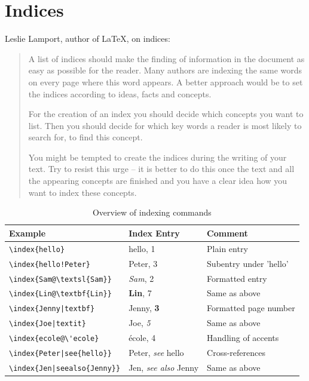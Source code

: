 \documentclass[11pt, a4paper]{article}
\newcommand{\ltx}{\LaTeX}
\begin{document}
\section{Indices}
Leslie Lamport, author of \ltx{}, on indices:
\begin{quote}
A list of indices should make the finding of information in the document as easy as possible for the reader. Many authors are indexing the same words on every page where this word appears. A better approach would be to set the indices according to ideas, facts and concepts.

For the creation of an index you should decide which concepts you want to list. Then you should decide for which key words a reader is most likely to search for, to find this concept. 

You might be tempted to create the indices during the writing of your text. Try to resist this urge -- it is better to do this once the text and all the appearing concepts are finished and you have a clear idea how you want to index these concepts.
\end{quote}


\begin{table}[h!]
\centering
\caption{Overview of indexing commands\label{tab:Indexbefehle}}
\begin{tabular}{lll}
\toprule
Example &	Index Entry	 & Comment\\
\midrule
\verb+\index{hello}+ &	hello, 1	& Plain entry \\
\verb+\index{hello!Peter}+	&  Peter, 3	 &Subentry under 'hello'\\
\verb+\index{Sam@\textsl{Sam}}+&	\textsl{Sam}, 2	&Formatted entry\\
\verb+\index{Lin@\textbf{Lin}}	+&	\textbf{Lin}, 7	&Same as above\\
\verb+\index{Jenny|textbf}+&	Jenny, \textbf{3}	&Formatted page number\\
\verb+\index{Joe|textit}+&	Joe, \textit{5}	&Same as above\\
\verb+\index{ecole@\'ecole}+&	école, 4&	Handling of accents\\
\verb+\index{Peter|see{hello}}+&	Peter, \textit{see} hello	&Cross-references\\
\verb+\index{Jen|seealso{Jenny}}+ &	Jen, \textit{see also} Jenny	&Same as above\\
\bottomrule

\end{tabular}

\end{table}%

\newpage

\printbibliography
\printindex
\end{document}
